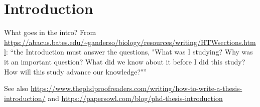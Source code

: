 \chapter{Introduction}


\begin{anfxwarning}{What goes in the intro?}
From \url{https://abacus.bates.edu/~ganderso/biology/resources/writing/HTWsections.html}:  ``the Introduction must answer the questions, "What was I studying? Why was it an important question? What did we know about it before I did this study? How will this study advance our knowledge?"''

See also \url{https://www.thephdproofreaders.com/writing/how-to-write-a-thesis-introduction/} and \url{https://papersowl.com/blog/phd-thesis-introduction}
\end{anfxwarning}

